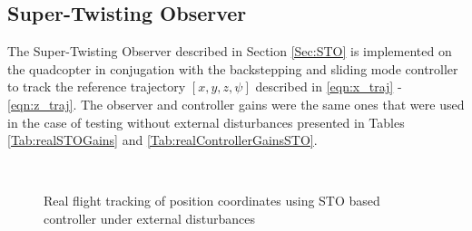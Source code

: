 \documentclass[letterpaper%
, twoside%
, 12pt%
,memoire%
, english%
,creativecommons,hyperref%
]{thETS}
\begin{document}
\subsection{Super-Twisting Observer}
The Super-Twisting Observer described in Section \ref{Sec:STO} is implemented on the quadcopter in conjugation with the backstepping and sliding mode controller to track the reference trajectory $[x,y,z,\psi]$ described in \eqref{eqn:x_traj} - \eqref{eqn:z_traj}. The observer and controller gains were the same ones that were used in the case of testing without external disturbances presented in Tables \ref{Tab:realSTOGains} and \ref{Tab:realControllerGainsSTO}. 

\begin{figure}[H]
	\centering
	 \\ \parbox{0.75\textwidth}{\caption{Real flight tracking of position coordinates using STO based controller under external disturbances\label{Fig:xyztracSTODist}}}
\end{figure}
\end{document}
